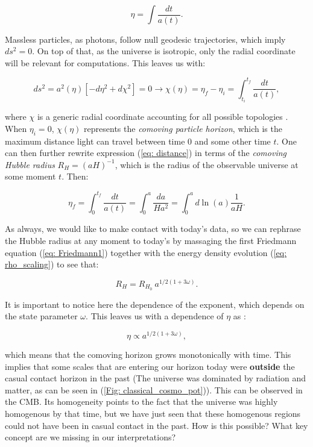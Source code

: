 \documentclass[11pt, a4paper]{article} %
\begin{document}
\begin{equation}
	\eta = \int \frac{dt}{a(t)}.
\end{equation}

Massless particles, as photons, follow null geodesic trajectories, which imply $ds^{2} = 0$. On top of that, as the universe is isotropic, only the radial coordinate will be relevant for computations. This leaves us with:

\begin{equation}\label{eq: distance}
	ds^{2} = a^{2}(\eta)\left[-d\eta^{2} + d\chi^{2}\right]=0 \longrightarrow \chi(\eta) = \eta_{f} - \eta_{i} = \int^{t_{f}}_{t_{i}} \frac{dt}{a(t)},
\end{equation}

where $\chi$ is a generic radial coordinate accounting for all possible topologies \cite{baumann2009tasi}. When $\eta_{i} =0$, $\chi(\eta)$ represents the \textit{comoving particle horizon}, which is the maximum distance light can travel between time 0 and some other time $t$. One can then further rewrite expression (\ref{eq: distance}) in terms of the \textit{comoving Hubble radius} $R_{H} = (a H)^{-1}$, which is the radius of the observable universe at some moment $t$. Then:

\begin{equation}
	\eta_{f} = \int^{t_{f}}_{0} \frac{dt}{a(t)} = \int^{a}_{0} \frac{da}{H a^{2}} = \int^{a}_{0} d \ln(a) \frac{1}{a H}.
\end{equation}

As always, we would like to make contact with today's data, so we can rephrase the Hubble radius at any moment to today's by massaging the first Friedmann equation (\ref{eq: Friedmann1}) together with the energy density evolution (\ref{eq: rho_scaling}) to see that:

\begin{equation}\label{eq: hubble_rad}
	R_{H} = R_{H_{0}} \: a ^{1/2(1+ 3 \omega)}.
\end{equation}

It is important to notice here the dependence of the exponent, which depends on the state parameter $\omega$. This leaves us with a dependence of $\eta$ as :

\begin{equation}
	\eta \propto a^{1/2\left(1+3\omega\right)},
\end{equation}

which means that the comoving horizon grows monotonically with time. This implies that some scales that are entering our horizon today were \textbf{outside} the casual contact horizon in the past (The universe was dominated by radiation and matter, as can be seen in (\ref{Fig: classical_cosmo_pot})). This can be observed in the CMB. Its homogeneity points to the fact that the universe was highly homogenous by that time, but we have just seen that these homogenous regions could not have been in casual contact in the past. How is this possible? What key concept are we missing in our interpretations?
\end{document}
